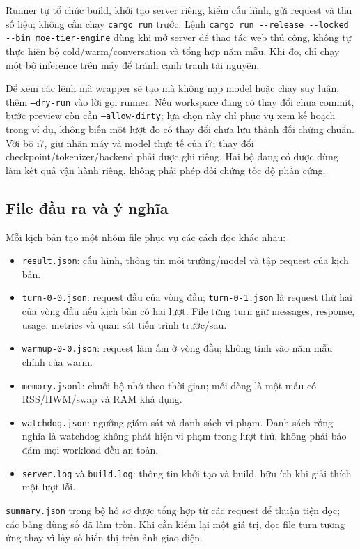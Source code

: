 Runner tự tổ chức build, khởi tạo server riêng, kiểm cấu hình, gửi request và thu số liệu; không cần chạy \texttt{cargo run} trước. Lệnh \nolinkurl{cargo run --release --locked --bin moe-tier-engine} dùng khi mở server để thao tác web thủ công, không tự thực hiện bộ cold/warm/conversation và tổng hợp năm mẫu. Khi đo, chỉ chạy một bộ inference trên máy để tránh cạnh tranh tài nguyên.

Để xem các lệnh mà wrapper sẽ tạo mà không nạp model hoặc chạy suy luận, thêm \texttt{--dry-run} vào lời gọi runner. Nếu workspace đang có thay đổi chưa commit, bước preview còn cần \texttt{--allow-dirty}; lựa chọn này chỉ phục vụ xem kế hoạch trong ví dụ, không biến một lượt đo có thay đổi chưa lưu thành đối chứng chuẩn. Với bộ i7, giữ nhãn máy và model thực tế của i7; thay đổi checkpoint/tokenizer/backend phải được ghi riêng. Hai bộ đang có được dùng làm kết quả vận hành riêng, không phải phép đối chứng tốc độ phần cứng.

\subsection{File đầu ra và ý nghĩa}

Mỗi kịch bản tạo một nhóm file phục vụ các cách đọc khác nhau:

\begin{itemize}
\item \texttt{result.json}: cấu hình, thông tin môi trường/model và tập request của kịch bản.
\item \texttt{turn-0-0.json}: request đầu của vòng đầu; \texttt{turn-0-1.json} là request thứ hai của vòng đầu nếu kịch bản có hai lượt. File từng turn giữ messages, response, usage, metrics và quan sát tiến trình trước/sau.
\item \texttt{warmup-0-0.json}: request làm ấm ở vòng đầu; không tính vào năm mẫu chính của warm.
\item \texttt{memory.jsonl}: chuỗi bộ nhớ theo thời gian; mỗi dòng là một mẫu có RSS/HWM/swap và RAM khả dụng.
\item \texttt{watchdog.json}: ngưỡng giám sát và danh sách vi phạm. Danh sách rỗng nghĩa là watchdog không phát hiện vi phạm trong lượt thử, không phải bảo đảm mọi workload đều an toàn.
\item \texttt{server.log} và \texttt{build.log}: thông tin khởi tạo và build, hữu ích khi giải thích một lượt lỗi.
\end{itemize}

\texttt{summary.json} trong bộ hồ sơ được tổng hợp từ các request để thuận tiện đọc; các bảng dùng số đã làm tròn. Khi cần kiểm lại một giá trị, đọc file turn tương ứng thay vì lấy số hiển thị trên ảnh giao diện.

